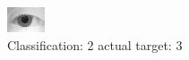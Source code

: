 \begin{figure}[h!]
\begin{center}
\includegraphics[width=0.60\columnwidth]{figures/ID1137_class_2_target_3.png}
\end{center}
\caption{ Classification: 2 actual target: 3}
\label{fig:ID1137_class_2_target_3}
\end{figure}

